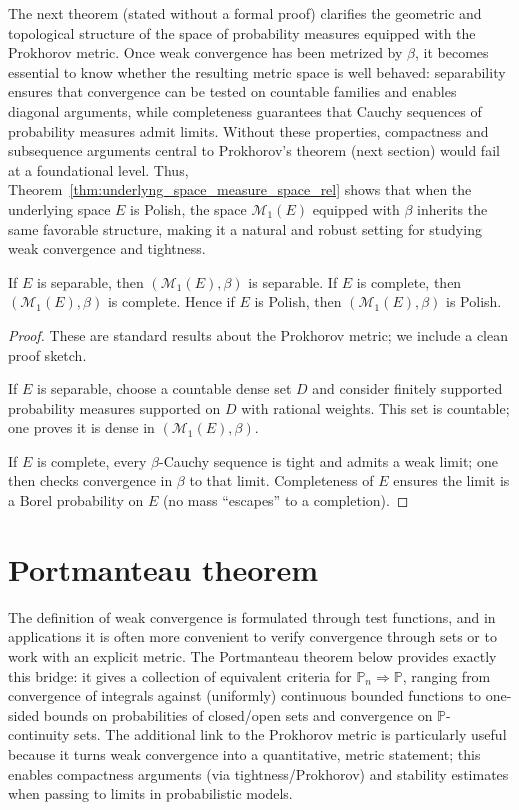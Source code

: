 The next theorem (stated without a formal proof) clarifies the geometric and topological structure of the space of probability measures equipped with the Prokhorov metric.
Once weak convergence has been metrized by $\beta$, it becomes essential to know whether the resulting metric space is well behaved:
separability ensures that convergence can be tested on countable families and enables diagonal arguments,
while completeness guarantees that Cauchy sequences of probability measures admit limits.
Without these properties, compactness and subsequence arguments central to Prokhorov’s theorem (next section) would fail at a foundational level.
Thus, Theorem~\ref{thm:underlyng_space_measure_space_rel} shows that when the underlying space $E$ is Polish, the space $\mathcal{M}_1(E)$ equipped with $\beta$
inherits the same favorable structure, making it a natural and robust setting for studying weak convergence and tightness.


\begin{theorem}\label{thm:underlyng_space_measure_space_rel}
If $E$ is separable, then $(\mathcal{M}_1(E),\beta)$ is separable. If $E$ is complete, then $(\mathcal{M}_1(E),\beta)$ is complete.
Hence if $E$ is Polish, then $(\mathcal{M}_1(E),\beta)$ is Polish.
\end{theorem}

\begin{proof}
These are standard results about the Prokhorov metric; we include a clean proof sketch.

If $E$ is separable, choose a countable dense set $D$ and consider finitely supported probability measures supported on $D$ with rational weights.
This set is countable; one proves it is dense in $(\mathcal{M}_1(E),\beta)$.

If $E$ is complete, every $\beta$-Cauchy sequence is tight and admits a weak limit; one then checks convergence in $\beta$ to that limit.
Completeness of $E$ ensures the limit is a Borel probability on $E$ (no mass “escapes” to a completion).
\end{proof}

\section{Portmanteau theorem}

The definition of weak convergence is formulated through test
functions, and in applications it is often more convenient to verify convergence through sets or to
work with an explicit metric.  The Portmanteau theorem below provides exactly this bridge: it gives a
collection of equivalent criteria for $\mathbb{P}_n\Rightarrow\mathbb{P}$, ranging from convergence
of integrals against (uniformly) continuous bounded functions to one-sided bounds on probabilities
of closed/open sets and convergence on $\mathbb{P}$-continuity sets.  The additional link to the
Prokhorov metric is particularly useful because it turns weak convergence into a quantitative,
metric statement; this enables compactness arguments (via tightness/Prokhorov) and stability
estimates when passing to limits in probabilistic models.


